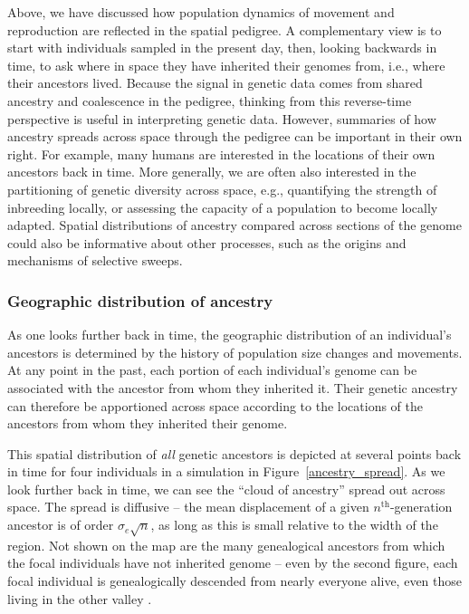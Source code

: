 \documentclass{ar-1col}
\newcommand{\todo}[1]{{\textbf{\color{red}{#1}}}}
\begin{document}
Above, we have discussed how population dynamics of movement and reproduction
are reflected in the spatial pedigree.
A complementary view is to
start with individuals sampled in the present day,
then, looking backwards in time,
to ask where in space they have inherited their genomes from, 
i.e., where their ancestors lived.
Because the signal in genetic data comes from 
shared ancestry and coalescence in the pedigree,
thinking from this reverse-time perspective 
is useful in interpreting genetic data.
However, summaries of how ancestry spreads across space 
through the pedigree can be important in their own right.
For example, many humans are interested
in the locations of their own ancestors back in time.
More generally,
we are often also interested in the partitioning of genetic diversity across space,
e.g.,
quantifying the strength of inbreeding locally,
or assessing the capacity of a population to become locally adapted.
Spatial distributions of ancestry compared across sections of the genome
could also be informative about 
other processes, such as
the origins and mechanisms of selective sweeps.


\subsubsection{Geographic distribution of ancestry}

\todo{estimation section? or parallel structure with other sections?}

As one looks further back in time,
the geographic distribution of an individual's ancestors
is determined by the history of population size changes and movements.
At any point in the past,
each portion of each individual's genome can be associated 
with the ancestor from whom they inherited it.
Their genetic ancestry can therefore be apportioned across space according
to the locations of the ancestors from whom they inherited their genome.

This spatial distribution of \textit{all} genetic ancestors is depicted 
at several points back in time
for four individuals in a simulation in Figure~\ref{ancestry_spread}.
As we look further back in time,
we can see the ``cloud of ancestry'' spread out across space.
The spread is diffusive --
the mean displacement of a given $n^\text{th}$-generation ancestor 
is of order $\sigma_e \sqrt{n}$,
as long as this is small relative to the width of the region.
Not shown on the map are the many genealogical ancestors
from which the focal individuals have not inherited genome --
even by the second figure,
each focal individual is genealogically descended from nearly everyone alive,
even those living in the other valley \citep{chang1999}.
\end{document}
